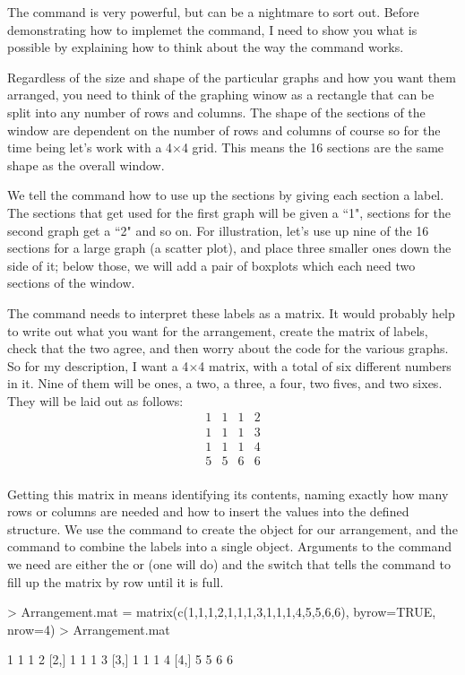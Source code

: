 The  command is very powerful, but can be a nightmare to sort out. Before demonstrating how to implemet the command, I need to show you what is possible by explaining how to think about the way the command works.

Regardless of the size and shape of the particular graphs and how you want them arranged, you need to think of the graphing winow as a rectangle that can be split into any number of rows and columns. The shape of the sections of the window are dependent on the number of rows and columns of course so for the time being let's work with a 4$\times$4 grid. This means the 16 sections are the same shape as the overall window.

We tell the  command how to use up the sections by giving each section a label. The sections that get used for the first graph will be given a ``1", sections for the second graph get a ``2" and so on. For illustration, let's use up nine of the 16 sections for a large graph (a scatter plot), and place three smaller ones down the side of it; below those, we will add a pair of boxplots which each need two sections of the window.

The  command needs to interpret these labels as a matrix. It would probably help to write out what you want for the arrangement, create the matrix of labels, check that the two agree, and then worry about the code for the various graphs. So for my description, I want a 4$\times$4 matrix, with a total of six different numbers in it. Nine of them will be ones, a two, a three, a four, two fives, and two sixes. They will be laid out as follows:
$$\begin{array}{cccc} 1&1&1&2\\ 1&1&1&3\\ 1&1&1&4\\ 5&5&6&6\\ \end{array}$$

Getting this matrix in \R{} means identifying its contents, naming exactly how many rows or columns are needed and how to insert the values into the defined structure. We use the  command to create the object for our arrangement, and the  command to combine the labels into a single object. Arguments to the  command we need are either the  or  (one will do) and the  switch that tells the  command to fill up the matrix by row until it is full.
\begin{Schunk}
\begin{Sinput}
> Arrangement.mat = matrix(c(1,1,1,2,1,1,1,3,1,1,1,4,5,5,6,6), byrow=TRUE, nrow=4)
> Arrangement.mat
\end{Sinput}
\begin{Soutput}
     [,1] [,2] [,3] [,4]
[1,]    1    1    1    2
[2,]    1    1    1    3
[3,]    1    1    1    4
[4,]    5    5    6    6
\end{Soutput}
\end{Schunk}

